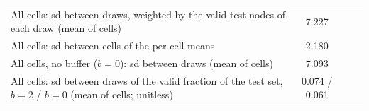 \begin{tabular}{lcccccc}
\multicolumn{4}{p{0.5\linewidth}}{\raggedright All cells: sd between draws, weighted by the valid test nodes of each draw (mean of cells)} & 7.227 & & \\
\multicolumn{4}{p{0.5\linewidth}}{\raggedright All cells: sd between cells of the per-cell means} & 2.180 & & \\
\multicolumn{4}{p{0.5\linewidth}}{\raggedright All cells, no buffer ($b=0$): sd between draws (mean of cells)} & 7.093 & & \\
\multicolumn{4}{p{0.5\linewidth}}{\raggedright All cells: sd between draws of the valid fraction of the test set, $b=2$ / $b=0$ (mean of cells; unitless)} & 0.074 / 0.061 & & \\
\bottomrule
\end{tabular}
